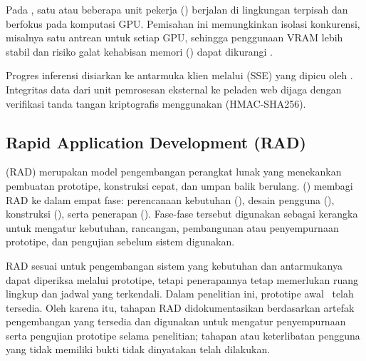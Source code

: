 Pada , satu atau beberapa unit pekerja () berjalan di lingkungan terpisah dan berfokus pada komputasi GPU. Pemisahan ini memungkinkan isolasi konkurensi, misalnya satu antrean untuk setiap GPU, sehingga penggunaan VRAM lebih stabil dan risiko galat kehabisan memori () dapat dikurangi .

Progres inferensi disiarkan ke antarmuka klien melalui  (SSE) yang dipicu oleh . Integritas data dari unit pemrosesan eksternal ke peladen web dijaga dengan verifikasi tanda tangan kriptografis menggunakan  (HMAC-SHA256).

\subsection{Rapid Application Development (RAD)}
 (RAD) merupakan model pengembangan perangkat lunak yang menekankan pembuatan prototipe, konstruksi cepat, dan umpan balik berulang. \citeauthor{martin_rapid_1991} (\citeyear{martin_rapid_1991}) membagi RAD ke dalam empat fase: perencanaan kebutuhan (), desain pengguna (), konstruksi (), serta penerapan (). Fase-fase tersebut digunakan sebagai kerangka untuk mengatur kebutuhan, rancangan, pembangunan atau penyempurnaan prototipe, dan pengujian sebelum sistem digunakan.

RAD sesuai untuk pengembangan sistem yang kebutuhan dan antarmukanya dapat diperiksa melalui prototipe, tetapi penerapannya tetap memerlukan ruang lingkup dan jadwal yang terkendali. Dalam penelitian ini, prototipe awal \namasistem\ telah tersedia. Oleh karena itu, tahapan RAD didokumentasikan berdasarkan artefak pengembangan yang tersedia dan digunakan untuk mengatur penyempurnaan serta pengujian prototipe selama penelitian; tahapan atau keterlibatan pengguna yang tidak memiliki bukti tidak dinyatakan telah dilakukan.

